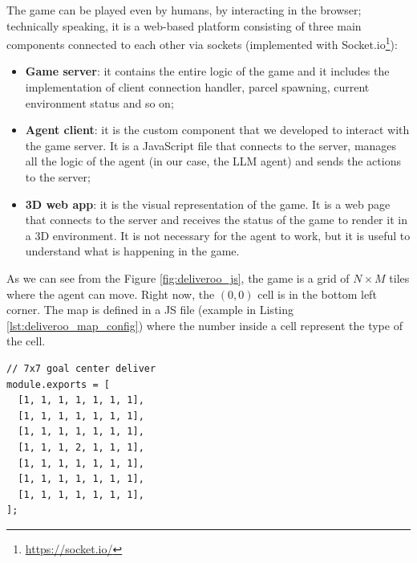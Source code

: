 The game can be played even by humans, by interacting in the browser; technically
speaking, it is a web-based platform consisting of three main components
connected to each other via sockets (implemented with Socket.io\footnote{\url{https://socket.io/}}):
\begin{itemize}
  \item \textbf{Game server}: it contains the entire logic of the game and it includes
    the implementation of client connection handler, parcel spawning, current environment
    status and so on;

  \item \textbf{Agent client}: it is the custom component that we developed to interact
    with the game server. It is a JavaScript file that connects to the server, manages
    all the logic of the agent (in our case, the LLM agent) and sends the
    actions to the server;

  \item \textbf{3D web app}: it is the visual representation of the game. It is
    a web page that connects to the server and receives the status of the game
    to render it in a 3D environment. It is not necessary for the agent to work,
    but it is useful to understand what is happening in the game.
\end{itemize}

As we can see from the Figure \ref{fig:deliveroo_js}, the game is a grid of
$N \times M$ tiles where the agent can move. Right now, the $(0, 0)$ cell is in
the bottom left corner. The map is defined in a JS file (example in Listing
\ref{lst:deliveroo_map_config}) where the number inside a cell represent the type
of the cell.

\vspace{10mm}
\begin{codewindow}
    \begin{lstlisting}
// 7x7 goal center deliver
module.exports = [
  [1, 1, 1, 1, 1, 1, 1],
  [1, 1, 1, 1, 1, 1, 1],
  [1, 1, 1, 1, 1, 1, 1],
  [1, 1, 1, 2, 1, 1, 1],
  [1, 1, 1, 1, 1, 1, 1],
  [1, 1, 1, 1, 1, 1, 1],
  [1, 1, 1, 1, 1, 1, 1],
];
\end{lstlisting}
\end{codewindow}
\vspace{10mm}

